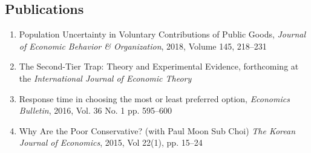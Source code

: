 \documentclass[margin]{res}
\begin{document}
\begin{resume}
\section{Publications}
\begin{enumerate}
\item Population Uncertainty in Voluntary Contributions of Public Goods, \emph{Journal of Economic Behavior \& Organization}, 2018, Volume 145, 218--231
\item The Second-Tier Trap: Theory and Experimental Evidence, forthcoming at the \emph{International Journal of Economic Theory}
\item Response time in choosing the most or least preferred option, \textit{Economics Bulletin}, 2016, Vol. 36 No. 1 pp. 595--600
\item Why Are the Poor Conservative? (with Paul Moon Sub Choi) \textit{The Korean Journal of Economics}, 2015, Vol 22(1), pp. 15--24
\end{enumerate}

%


\end{resume}
\end{document}
